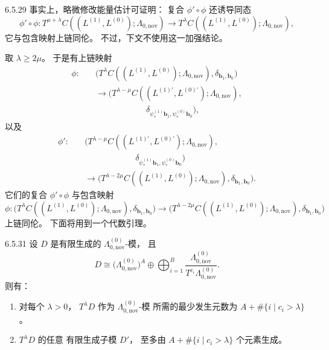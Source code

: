 \begin{remark}{6.5.29}\label{rem:6-5-29}
事实上，略微修改能量估计可证明：
复合 $\phi'\circ\phi$
还诱导同态
\[
\phi'\circ\phi:
T^{\mu+\lambda}
C((L^{(1)},L^{(0)});\Lambda_{0,\mathrm{nov}})
\longrightarrow
T^\lambda
C((L^{(1)},L^{(0)});\Lambda_{0,\mathrm{nov}}),
\]
它与包含映射上链同伦。
不过，下文不使用这一加强结论。
\end{remark}

取 $\lambda\ge2\mu$。
于是有上链映射
\begin{equation}
\begin{aligned}
\phi:\quad
&\bigl(T^\lambda C((L^{(1)},L^{(0)});
\Lambda_{0,\mathrm{nov}}),
\delta_{\mathbf b_1,\mathbf b_0}\bigr)\\
&\longrightarrow
\bigl(T^{\lambda-\mu}
C((L^{(1)\prime},L^{(0)\prime});
\Lambda_{0,\mathrm{nov}}),\\
&\hspace{6em}
\delta_{\psi_*^{(1)}\mathbf b_1,
\psi_*^{(0)}\mathbf b_0}\bigr),
\end{aligned}
\tag{6.5.30.1}\label{eq:6-5-30-1}
\end{equation}
以及
\begin{equation}
\begin{aligned}
\phi':\quad
&\bigl(T^{\lambda-\mu}
C((L^{(1)\prime},L^{(0)\prime});
\Lambda_{0,\mathrm{nov}}),\\
&\hspace{6em}
\delta_{\psi_*^{(1)}\mathbf b_1,
\psi_*^{(0)}\mathbf b_0}\bigr)\\
&\longrightarrow
\bigl(T^{\lambda-2\mu}
C((L^{(1)},L^{(0)});
\Lambda_{0,\mathrm{nov}}),
\delta_{\mathbf b_1,\mathbf b_0}\bigr).
\end{aligned}
\tag{6.5.30.2}\label{eq:6-5-30-2}
\end{equation}
它们的复合 $\phi'\circ\phi$
与包含映射
\[
\phi:
\bigl(T^\lambda C((L^{(1)},L^{(0)});
\Lambda_{0,\mathrm{nov}}),
\delta_{\mathbf b_1,\mathbf b_0}\bigr)
\longrightarrow
\bigl(T^{\lambda-2\mu}
C((L^{(1)},L^{(0)});
\Lambda_{0,\mathrm{nov}}),
\delta_{\mathbf b_1,\mathbf b_0}\bigr)
\]
上链同伦。
下面将用到一个代数引理。

\begin{lemma}{6.5.31}\label{lem:6-5-31}
设 $D$ 是有限生成的
$\Lambda_{0,\mathrm{nov}}^{(0)}$-模，
且
\[
D\cong
\bigl(\Lambda_{0,\mathrm{nov}}^{(0)}\bigr)^A
\oplus
\bigoplus_{i=1}^{B}
\frac{\Lambda_{0,\mathrm{nov}}^{(0)}}
{T^{c_i}\Lambda_{0,\mathrm{nov}}^{(0)}}.
\]
则有：
\begin{enumerate}[label=\textup{(\arabic*)},leftmargin=2.5em]
\item 对每个 $\lambda>0$，
$T^\lambda D$ 作为
$\Lambda_{0,\mathrm{nov}}^{(0)}$-模
所需的最少发生元数为
$A+\#\{i\mid c_i>\lambda\}$。
\item $T^\lambda D$ 的任意
有限生成子模 $D'$，
至多由
$A+\#\{i\mid c_i>\lambda\}$
个元素生成。
\end{enumerate}
\end{lemma}

